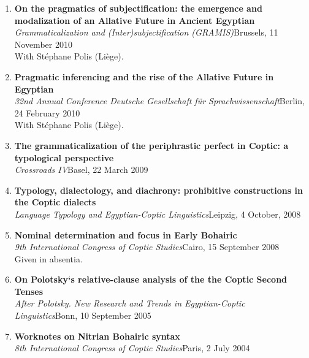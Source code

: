 \documentclass[letterpaper,11pt]{article}
\begin{document}
\begin{enumerate}
\item \textbf{On the pragmatics of subjectification: the emergence and modalization of an Allative Future in Ancient Egyptian}\\ \textit{Grammaticalization and (Inter)subjectification (GRAMIS)}\hfill{Brussels, 11 November 2010}\\With St\'{e}phane Polis (Li\`{e}ge). 

\item \textbf{Pragmatic inferencing and the rise of the Allative Future in Egyptian}\\\textit{32nd Annual Conference 
Deutsche Gesellschaft f\"ur Sprachwissenschaft}\hfill{Berlin, 24 February 2010}\\With St\'ephane Polis (Li\`{e}ge).

\item \textbf{The grammaticalization of the periphrastic perfect in Coptic: a typological perspective}\\\textit{Crossroads IV}\hfill{Basel, 22 March 2009} 

\item \textbf{Typology, dialectology, and diachrony: prohibitive constructions in the Coptic dialects}\\\textit{Language Typology and Egyptian-Coptic Linguistics}\hfill{Leipzig, 4 October, 2008}

\item \textbf{Nominal determination and focus in Early Bohairic}\\\textit{9th International Congress of Coptic Studies}\hfill{Cairo, 15 September 2008}\\Given in absentia.

\item \textbf{On Polotsky`s relative-clause analysis of the the Coptic Second Tenses}\\\textit{After Polotsky. New Research and Trends in Egyptian-Coptic Linguistics}\hfill{Bonn, 10 September 2005}

\item \textbf{Worknotes on Nitrian Bohairic syntax}\\\textit{8th International Congress of Coptic Studies}\hfill{Paris, 2 July 2004} 
\end{enumerate}
\end{document}
